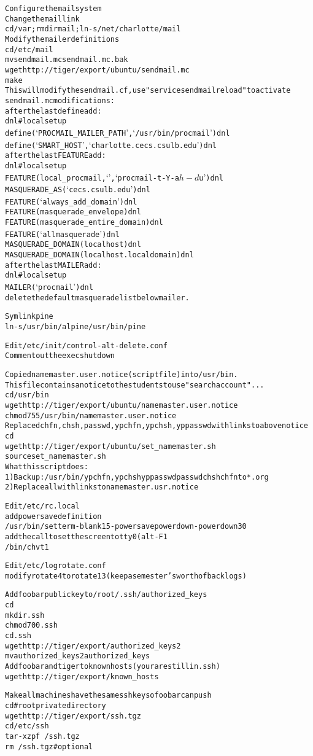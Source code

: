 \begin{alltt}
Configure the mail system
 Change the mail link
  cd /var ; rmdir mail; ln -s /net/charlotte/mail
 Modify the mailer definitions
  cd /etc/mail 
  mv sendmail.mc sendmail.mc.bak
  wget http://tiger/export/ubuntu/sendmail.mc
  make
   This will modify the sendmail.cf, use "service sendmail reload" to activate
  sendmail.mc modifications:
   after the last define add:
    dnl # local setup
    define(`PROCMAIL_MAILER_PATH', `/usr/bin/procmail')dnl
    define(`SMART_HOST', `charlotte.cecs.csulb.edu')dnl
   after the last FEATURE add:
    dnl # local setup
    FEATURE(local_procmail, `', `procmail -t -Y -a $h -d $u')dnl
    MASQUERADE_AS(`cecs.csulb.edu')dnl
    FEATURE(`always_add_domain')dnl
    FEATURE(masquerade_envelope)dnl
    FEATURE(masquerade_entire_domain)dnl
    FEATURE(`allmasquerade')dnl
    MASQUERADE_DOMAIN(localhost)dnl
    MASQUERADE_DOMAIN(localhost.localdomain)dnl
   after the last MAILER add:
    dnl # local setup
    MAILER(`procmail')dnl
   delete the default masquerade list below mailer.

Symlink pine
  ln -s /usr/bin/alpine /usr/bin/pine

Edit /etc/init/control-alt-delete.conf
Comment out  the exec shutdown

Copied namemaster.user.notice (script file) into /usr/bin.
  This file contains a notice to the students to use "search account"...
 cd /usr/bin
 wget http://tiger/export/ubuntu/namemaster.user.notice
 chmod 755 /usr/bin/namemaster.user.notice
Replaced chfn,chsh,passwd,ypchfn,ypchsh,yppasswd with links to above notice
 cd
 wget http://tiger/export/ubuntu/set_namemaster.sh
 source set_namemaster.sh
  What this script does:
   1) Backup: /usr/bin/ ypchfn, ypchsh yppasswd passwd chsh chfn to *.org
   2) Replace all with  links to namemaster.usr.notice

Edit /etc/rc.local
  add powersave definition
 /usr/bin/setterm -blank 15 -powersave powerdown -powerdown 30
  add the call to set the screen to tty0 (alt-F1
 /bin/chvt 1

Edit /etc/logrotate.conf
 modify rotate 4 to rotate 13 (keep a semester's worth of backlogs)

Add foobar public key to /root/.ssh/authorized_keys
 cd
 mkdir .ssh
 chmod 700 .ssh
 cd .ssh
 wget http://tiger/export/authorized_keys2
 mv authorized_keys2 authorized_keys
Add foobar and tiger to known hosts (your are still in .ssh)
 wget http://tiger/export/known_hosts

Make all machines have the same ssh key so foobar can push
  cd  # root private directory
  wget http://tiger/export/ssh.tgz
  cd /etc/ssh
  tar -xzpf ~/ssh.tgz
  rm ~/ssh.tgz  # optional


\end{alltt}
